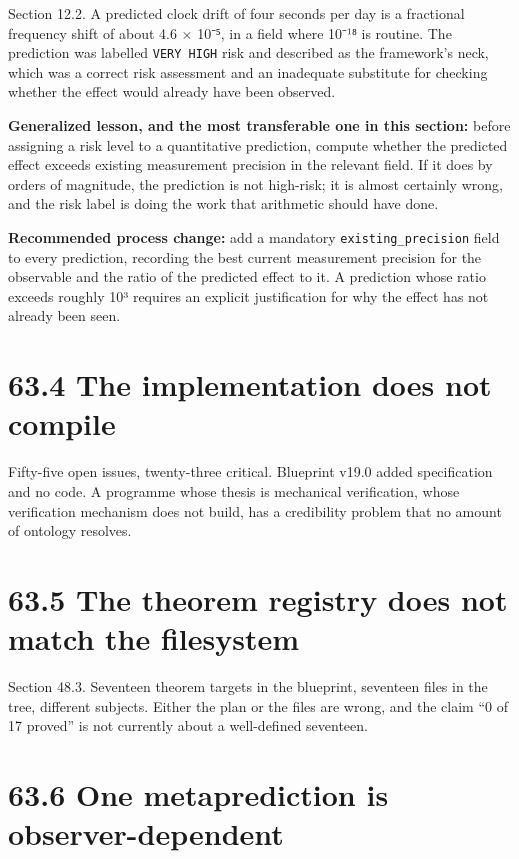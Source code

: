 \documentclass[
  11pt]{report}
\begin{document}
Section 12.2. A predicted clock drift of four seconds per day is a
fractional frequency shift of about 4.6 × 10⁻⁵, in a field where 10⁻¹⁸
is routine. The prediction was labelled \texttt{VERY\ HIGH} risk and
described as the framework's neck, which was a correct risk assessment
and an inadequate substitute for checking whether the effect would
already have been observed.

\textbf{Generalized lesson, and the most transferable one in this
section:} before assigning a risk level to a quantitative prediction,
compute whether the predicted effect exceeds existing measurement
precision in the relevant field. If it does by orders of magnitude, the
prediction is not high-risk; it is almost certainly wrong, and the risk
label is doing the work that arithmetic should have done.

\textbf{Recommended process change:} add a mandatory
\texttt{existing\_precision} field to every prediction, recording the
best current measurement precision for the observable and the ratio of
the predicted effect to it. A prediction whose ratio exceeds roughly 10³
requires an explicit justification for why the effect has not already
been seen.

\hypertarget{the-implementation-does-not-compile}{%
\section{63.4 The implementation does not
compile}\label{the-implementation-does-not-compile}}

Fifty-five open issues, twenty-three critical. Blueprint v19.0 added
specification and no code. A programme whose thesis is mechanical
verification, whose verification mechanism does not build, has a
credibility problem that no amount of ontology resolves.

\hypertarget{the-theorem-registry-does-not-match-the-filesystem}{%
\section{63.5 The theorem registry does not match the
filesystem}\label{the-theorem-registry-does-not-match-the-filesystem}}

Section 48.3. Seventeen theorem targets in the blueprint, seventeen
files in the tree, different subjects. Either the plan or the files are
wrong, and the claim ``0 of 17 proved'' is not currently about a
well-defined seventeen.

\hypertarget{one-metaprediction-is-observer-dependent}{%
\section{63.6 One metaprediction is
observer-dependent}\label{one-metaprediction-is-observer-dependent}}
\end{document}
